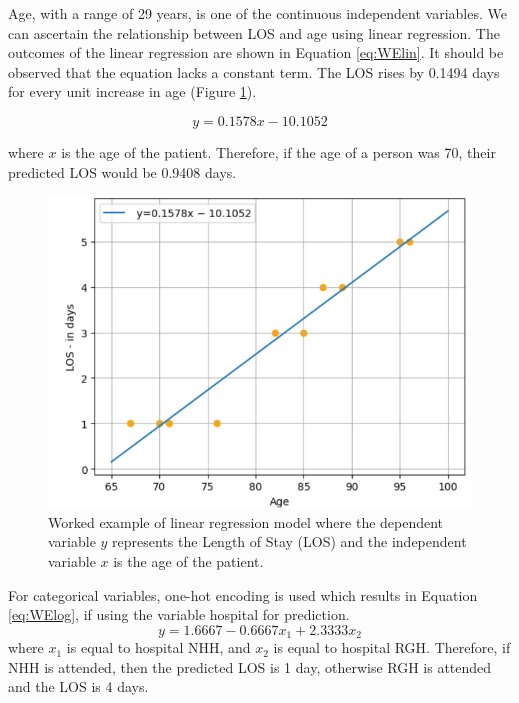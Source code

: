 \documentclass[../thesis.tex]{subfiles}
\begin{document}
Age, with a range of 29 years, is one of the continuous independent variables. We can ascertain the relationship between LOS and age using linear regression. The outcomes of the linear regression are shown in Equation \eqref{eq:WElin}. It should be observed that the equation lacks a constant term. The LOS rises by 0.1494 days for every unit increase in age (Figure \ref{fig:WorkedExampleLinReg}). 

\begin{equation}\label{eq:WElin}
    y = 0.1578x -10.1052
\end{equation}

where $x$ is the age of the patient. Therefore, if the age of a person was 70, their predicted LOS would be 0.9408 days.

\begin{figure}[h!]
    \centering
    \includegraphics[scale=0.7]{Chapters/Chapter3/Figures/WorkedExampleLinearReg1.png}
    \caption{Worked example of linear regression model where the dependent variable \(y\) represents the Length of Stay (LOS) and the independent variable \(x\) is the age of the patient.}
    \label{fig:WorkedExampleLinReg}
\end{figure}

For categorical variables, one-hot encoding is used which results in Equation \eqref{eq:WElog}, if using the variable hospital for prediction.
\begin{equation}\label{eq:WElog}
    y=1.6667 -0.6667x_{1} +2.3333x_{2}
\end{equation}
where $x_1$ is equal to hospital NHH, and $x_2$ is equal to hospital RGH. Therefore, if NHH is attended, then the predicted LOS is 1 day, otherwise RGH is attended and the LOS is 4 days.
\end{document}
